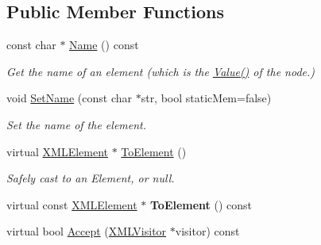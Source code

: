 \subsection*{Public Member Functions}
\begin{DoxyCompactItemize}
\item 
\mbox{\label{classtinyxml2_1_1XMLElement_a63e057fb5baee1dd29f323cb85907b35}} 
const char $\ast$ \mbox{\hyperlink{classtinyxml2_1_1XMLElement_a63e057fb5baee1dd29f323cb85907b35}{Name}} () const
\begin{DoxyCompactList}\small\item\em Get the name of an element (which is the \mbox{\hyperlink{classtinyxml2_1_1XMLNode_a66344989a4b436155bcda72bd6b07b82}{Value()}} of the node.) \end{DoxyCompactList}\item 
\mbox{\label{classtinyxml2_1_1XMLElement_a97712009a530d8cb8a63bf705f02b4f1}} 
void \mbox{\hyperlink{classtinyxml2_1_1XMLElement_a97712009a530d8cb8a63bf705f02b4f1}{Set\+Name}} (const char $\ast$str, bool static\+Mem=false)
\begin{DoxyCompactList}\small\item\em Set the name of the element. \end{DoxyCompactList}\item 
\mbox{\label{classtinyxml2_1_1XMLElement_ad9ff5c2dbc15df36cf664ce1b0ea0a5d}} 
virtual \mbox{\hyperlink{classtinyxml2_1_1XMLElement}{X\+M\+L\+Element}} $\ast$ \mbox{\hyperlink{classtinyxml2_1_1XMLElement_ad9ff5c2dbc15df36cf664ce1b0ea0a5d}{To\+Element}} ()
\begin{DoxyCompactList}\small\item\em Safely cast to an Element, or null. \end{DoxyCompactList}\item 
\mbox{\label{classtinyxml2_1_1XMLElement_afeb353047ab8532191709dcaef07337e}} 
virtual const \mbox{\hyperlink{classtinyxml2_1_1XMLElement}{X\+M\+L\+Element}} $\ast$ {\bfseries To\+Element} () const
\item 
virtual bool \mbox{\hyperlink{classtinyxml2_1_1XMLElement_a3ea8a40e788fb9ad876c28a32932c6d5}{Accept}} (\mbox{\hyperlink{classtinyxml2_1_1XMLVisitor}{X\+M\+L\+Visitor}} $\ast$visitor) const
\item 

\end{DoxyCompactItemize}
